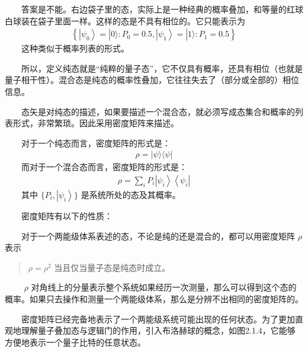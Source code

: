 \documentclass[a4paper,11pt,english]{sphinxmanual}
\begin{document}
\sphinxAtStartPar
  答案是不能。右边袋子里的态，实际上是一种经典的概率叠加，和等量的红球白球装在袋子里面一样。这样的态是不具有相位的。它只能表示为
\begin{equation*}
\begin{split}\left\{\left|\psi_{0}\right\rangle=|0\rangle: P_{0}=0.5,\left|\psi_{1}\right\rangle=|1\rangle: P_{1}=0.5\right\}\end{split}
\end{equation*}
\sphinxAtStartPar
  这种类似于概率列表的形式。

\sphinxAtStartPar
  所以，定义纯态就是“纯粹的量子态”，它不仅具有概率，还具有相位（也就是量子相干性）。混合态是纯态的概率性叠加，它往往失去了（部分或全部的）相位信息。

\sphinxAtStartPar
{}

\sphinxAtStartPar
  态矢是对纯态的描述，如果要描述一个混合态，就必须写成态集合和概率的列表形式，非常繁琐。因此采用密度矩阵来描述。

\sphinxAtStartPar
  对于一个纯态而言，密度矩阵的形式是：
\begin{equation*}
\begin{split}\rho=|\psi\rangle\langle\psi|\end{split}
\end{equation*}
\sphinxAtStartPar
  而对于一个混合态而言，密度矩阵的形式是：
\begin{equation*}
\begin{split}\rho=\sum_{i} P_{i}\left|\psi_{i}\right\rangle\left\langle\psi_{i}\right|\end{split}
\end{equation*}
\sphinxAtStartPar
  其中 \(\{P_{i},\left|\psi_{i}\right\rangle\}\) 是系统所处的态及其概率。

\sphinxAtStartPar
  密度矩阵有以下的性质：

\sphinxAtStartPar
  对于一个两能级体系表述的态，不论是纯的还是混合的，都可以用密度矩阵  \(\rho\) 表示
\begin{quote}

\sphinxAtStartPar
\(\rho=\rho^{2}\) 当且仅当量子态是纯态时成立。
\end{quote}

\sphinxAtStartPar
   \(\rho\) 对角线上的分量表示整个系统如果经历一次测量，那么可以得到这个态的概率。如果只去操作和测量一个两能级体系，那么是分辨不出相同的密度矩阵的。

\sphinxAtStartPar
  密度矩阵已经完备地表示了一个两能级系统可能出现的任何状态。为了更加直观地理解量子叠加态与逻辑门的作用，引入布洛赫球的概念，如图2.1.4，它能够方便地表示一个量子比特的任意状态。
\end{document}
